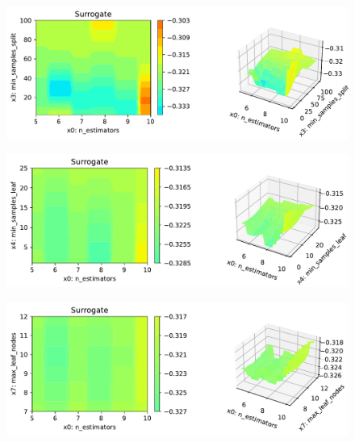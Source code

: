 \documentclass[
  letterpaper,
  DIV=11,
  numbers=noendperiod]{scrreprt}
\begin{document}
\begin{figure}[H]

{\centering \includegraphics{16_spot_hpt_sklearn_multiclass_classification_randomforest_files/figure-pdf/cell-49-output-3.pdf}

}

\end{figure}

\begin{figure}[H]

{\centering \includegraphics{16_spot_hpt_sklearn_multiclass_classification_randomforest_files/figure-pdf/cell-49-output-4.pdf}

}

\end{figure}

\begin{figure}[H]

{\centering \includegraphics{16_spot_hpt_sklearn_multiclass_classification_randomforest_files/figure-pdf/cell-49-output-5.pdf}

}

\end{figure}
\end{document}

